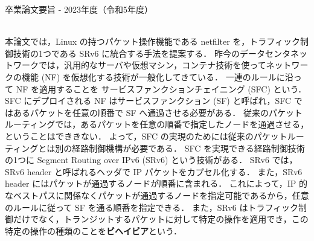卒業論文要旨 - 2023年度（令和5年度）
\begin{center}
\begin{large}
\end{large}
\end{center}

~ \\
本論文では，Linux の持つパケット操作機能である netfilter を，トラフィック制御技術の1つである SRv6 に統合する手法を提案する．
昨今のデータセンタネットワークでは，汎用的なサーバや仮想マシン，コンテナ技術を使ってネットワークの機能 (NF) を仮想化する技術が一般化してきている．
一連のルールに沿って NF を適用することを サービスファンクションチェイニング (SFC) という．
SFC にデプロイされる NF はサービスファンクション (SF) と呼ばれ，SFC ではあるパケットを任意の順番で SF へ通過させる必要がある．
従来のパケットルーティングでは，あるパケットを任意の順番で指定したノードを通過させる，ということはでききない．
よって，SFC の実現のためには従来のパケットルーティングとは別の経路制御機構が必要である．
SFC を実現できる経路制御技術の1つに Segment Routing over IPv6 (SRv6) という技術がある．
SRv6 では，SRv6 header と呼ばれるヘッダで IP パケットをカプセル化する．
また，SRv6 header にはパケットが通過するノードが順番に含まれる．
これによって，IP 的なベストパスに関係なくパケットが通過するノードを指定可能であるから，任意のルールに従って SF を通る順番を指定できる．
また，SRv6 はトラフィック制御だけでなく，トランジットするパケットに対して特定の操作を適用でき，この特定の操作の種類のことを\textbf{ビヘイビア}という．

